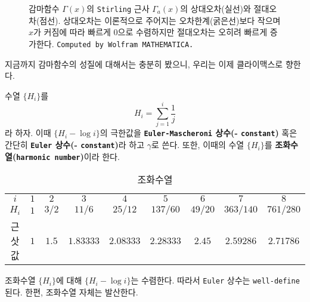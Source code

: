 \begin{figure}[!ht]
    \caption{감마함수 $\Gamma(x)$의 \texttt{Stirling} 근사 $\Gamma_a(x)$의 상대오차(실선)와 절대오차(점선). 상대오차는 이론적으로 주어지는 오차한계(굵은선)보다 작으며 $x$가 커짐에 따라 빠르게 $0$으로 수렴하지만 절대오차는 오히려 빠르게 증가한다. \texttt{Computed by Wolfram MATHEMATICA.}}
\end{figure}

지금까지 감마함수의 성질에 대해서는 충분히 봤으니, 우리는 이제 클라이맥스로 향한다.

\begin{definition}
    수열 $\{H_i\}$를
    \begin{equation*}
        H_i=\sum_{j=1}^i\frac{1}{j}
    \end{equation*}
    라 하자. 이때 $\{H_i-\log i\}$의 극한값을 \textbf{\texttt{Euler-Mascheroni} 상수(- \texttt{constant})} 혹은 간단히 \textbf{\texttt{Euler} 상수(- \texttt{constant})}라 하고 $\gamma$로 쓴다. 또한, 이때의 수열 $\{H_i\}$를 \textbf{조화수열(\texttt{harmonic number})}이라 한다.
\end{definition}

\begin{table}
    \caption{조화수열}
    \begin{tabularx}{\textwidth}{C|CCCCCCCC}
    \hline
    $i$ & $1$ & $2$ & $3$ & $4$ & $5$ & $6$ & $7$ & $8$\\
    \svhline
    $H_i$ & $1$ & $3/2$ & $11/6$ & $25/12$ & $137/60$ & $49/20$ & $363/140$ & $761/280$\\
    근삿값 & $1$ & $1.5$ & $1.83333$ & $2.08333$ & $2.28333$ & $2.45$ & $2.59286$ & $2.71786$\\
    \hline
    \end{tabularx}
\end{table}

\begin{proposition}\label{prop:eulerConstant}
    조화수열 $\{H_i\}$에 대해 $\{H_i-\log i\}$는 수렴한다. 따라서 \texttt{Euler} 상수는 \texttt{well-define}된다. 한편, 조화수열 자체는 발산한다.
\end{proposition}

